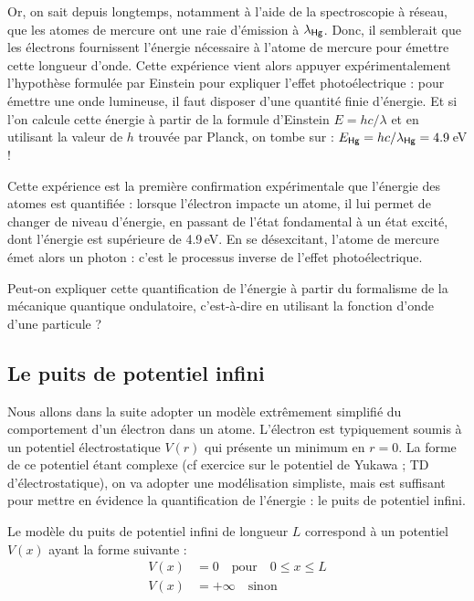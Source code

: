 \documentclass[11pt,fleqn]{book} %
\begin{document}
Or, on sait depuis longtemps, notamment à l'aide de la spectroscopie à réseau, que les atomes de mercure ont une raie d'émission à $\lambda_{\ce{Hg}}$. Donc, il semblerait que les électrons fournissent l'énergie nécessaire à l'atome de mercure pour émettre cette longueur d'onde. Cette expérience vient alors appuyer expérimentalement l'hypothèse formulée par Einstein pour expliquer l'effet photoélectrique : pour émettre une onde lumineuse, il faut disposer d'une quantité finie d'énergie. Et si l'on calcule cette énergie à partir de la formule d'Einstein $E = h c / \lambda$ et en utilisant la valeur de $h$ trouvée par Planck, on tombe sur : $E_{\ce{Hg}} = hc/\lambda_{\ce{Hg}} = 4.9$\,eV !

Cette expérience est la première confirmation expérimentale que l'énergie des atomes est quantifiée : lorsque l'électron impacte un atome, il lui permet de changer de niveau d'énergie, en passant de l'état fondamental à un état excité, dont l'énergie est supérieure de 4.9\,eV. En se désexcitant, l'atome de mercure émet alors un photon : c'est le processus inverse de l'effet photoélectrique.

Peut-on expliquer cette quantification de l'énergie à partir du formalisme de la mécanique quantique ondulatoire, c'est-à-dire en utilisant la fonction d'onde d'une particule ?

\subsection{Le puits de potentiel infini}

Nous allons dans la suite adopter un modèle extrêmement simplifié du comportement d'un électron dans un atome. L'électron est typiquement soumis à un potentiel électrostatique $V(r)$ qui présente un minimum en $r=0$. La forme de ce potentiel étant complexe (cf exercice sur le potentiel de Yukawa ; TD d'électrostatique), on va adopter une modélisation simpliste, mais est suffisant pour mettre en évidence la quantification de l'énergie : le puits de potentiel infini. 

\begin{definition}
	Le modèle du puits de potentiel infini de longueur $L$ correspond à un potentiel $V(x)$ ayant la forme suivante :
	\begin{align}
		V(x) &= 0 \quad \mathrm{pour} \quad 0 \le x \le L \\
		V(x) &= + \infty \quad \mathrm{sinon}
	\end{align}
\end{definition}
\end{document}
